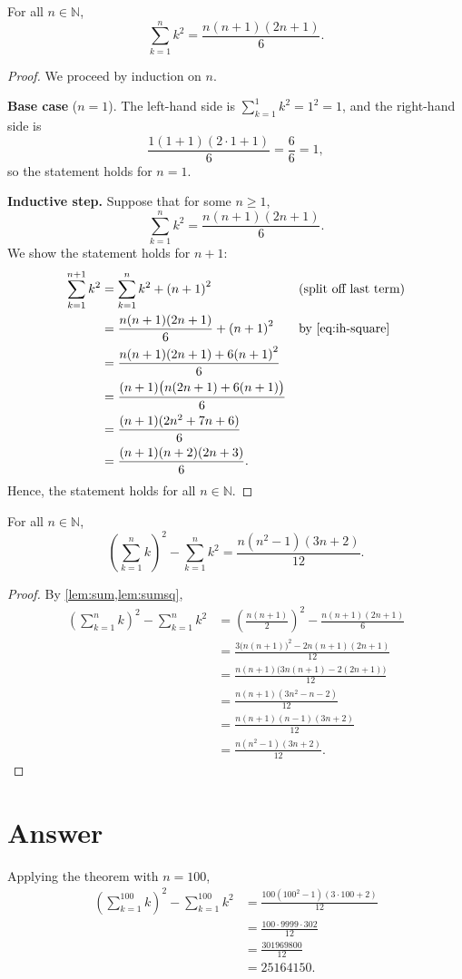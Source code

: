 \documentclass{article}
\begin{document}
\begin{lemma}\label{lem:sumsq}
  For all $n \in \mathbb{N}$,
  \[
    \sum_{k=1}^{n} k^2 = \frac{n(n+1)(2n+1)}{6}.
  \]
\end{lemma}
\begin{proof}
  We proceed by induction on $n$.

  \textbf{Base case} ($n = 1$).
  The left-hand side is $\sum_{k=1}^{1} k^2 = 1^2 = 1$, and the right-hand side is
  \[
    \frac{1(1+1)(2 \cdot 1+1)}{6} = \frac{6}{6} = 1,
  \]
  so the statement holds for $n = 1$.

  \textbf{Inductive step.}
  Suppose that for some $n \ge 1$,
  \begin{equation}\label{eq:ih-square}
    \sum_{k=1}^{n} k^2 = \frac{n(n+1)(2n+1)}{6}. \tag{IH}
  \end{equation}
  We show the statement holds for $n+1$:
  \begin{align*}
    \sum_{k=1}^{n+1} k^2
      &= \sum_{k=1}^{n} k^2 + {(n+1)}^2      && \text{(split off last term)} \\
      &= \frac{n(n+1)(2n+1)}{6} + {(n+1)}^2  && \text{by~\eqref{eq:ih-square}} \\
      &= \frac{n(n+1)(2n+1) + 6{(n+1)}^2}{6} \\
      &= \frac{(n+1)\bigl(n(2n+1) + 6(n+1)\bigr)}{6} \\
      &= \frac{(n+1)(2n^2 + 7n + 6)}{6} \\
      &= \frac{(n+1)(n+2)(2n+3)}{6}.
  \end{align*}
  Hence, the statement holds for all $n \in \mathbb{N}$.
\end{proof}

\begin{theorem}
  For all $n \in \mathbb{N}$,
  \[
    {\left(\sum_{k=1}^{n} k\right)}^2 - \sum_{k=1}^{n} k^2 = \frac{n(n^2-1)(3n+2)}{12}.
  \]
\end{theorem}
\begin{proof}
  By \cref{lem:sum,lem:sumsq},
  \begin{align*}
    {\left(\sum_{k=1}^{n} k\right)}^2 - \sum_{k=1}^{n} k^2
      &= {\left(\frac{n(n+1)}{2}\right)}^2 - \frac{n(n+1)(2n+1)}{6} \\
      &= \frac{3{\bigl(n(n+1)\bigr)}^2 - 2n(n+1)(2n+1)}{12} \\
      &= \frac{n(n+1)\bigl(3n(n+1) - 2(2n+1)\bigr)}{12} \\
      &= \frac{n(n+1)(3n^2 - n - 2)}{12} \\
      &= \frac{n(n+1)(n-1)(3n+2)}{12} \\
      &= \frac{n(n^2-1)(3n+2)}{12}.
  \end{align*}
\end{proof}

\section*{Answer}
Applying the theorem with $n = 100$,
\begin{align*}
  {\left(\sum_{k=1}^{100} k\right)}^2 - \sum_{k=1}^{100} k^2
    &= \frac{100(100^2 - 1)(3 \cdot 100 + 2)}{12} \\
    &= \frac{100 \cdot 9999 \cdot 302}{12} \\
    &= \frac{301969800}{12} \\
    &= 25164150.
\end{align*}
\end{document}

